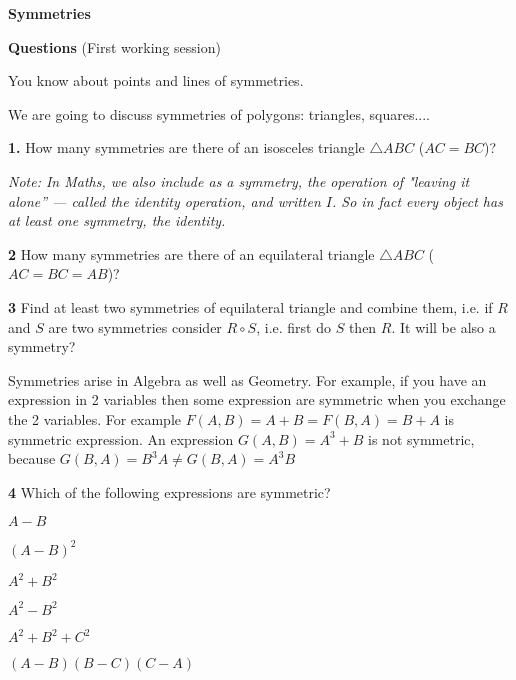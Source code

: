 

  \centerline {\bf Symmetries}

\bigskip

    \centerline{{\bf Questions} (First working session)}
\bigskip

You know about points and lines of symmetries.

We are going to discuss symmetries of polygons: triangles,
squares....

\bigskip


{\bf 1.}  How many symmetries are there of an isosceles triangle $\triangle ABC$ ($AC=BC$)?

\medskip

{\it Note: In Maths, we also include as a symmetry, the operation of "leaving it
alone'' --- called the identity operation, and written $I$. So in fact every
object has at least one symmetry, the identity.}



\bigskip

{\bf 2}
  How many symmetries are there of an equilateral triangle  $\triangle ABC$ ($AC=BC=AB$)?

\medskip

{\bf 3} Find at least two symmetries of equilateral triangle and combine them,
   i.e. if $R$ and $S$ are two symmetries consider $R\circ S$, i.e. first do  $S$
   then $R$.  It will be also a symmetry?



\bigskip


Symmetries arise in Algebra as well as Geometry.  For example, if you have an
expression in 2 variables then some expression are symmetric when you
exchange the 2 variables.  For example  $F(A,B)=A+B=F(B,A)=B+A$ is symmetric expression.
  An expression  $G(A,B)=A^3+B$ is not symmetric, because $G(B,A)=B^3A\not =G(B,A)=A^3B$

\medskip

{\bf 4} Which of the following expressions are symmetric?

$A-B$

$(A-B)^2$

$A^2+B^2$

$A^2-B^2$



$A^2+B^2+C^2$

$(A-B)(B-C)(C-A)$





\bye
